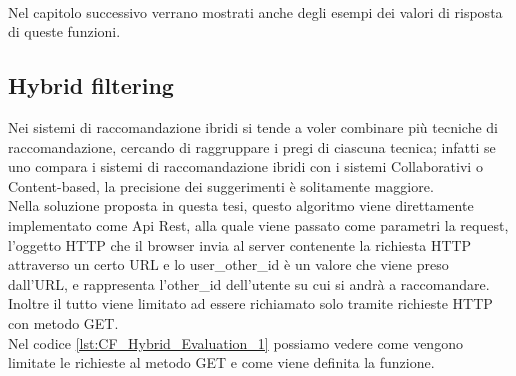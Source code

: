 \ \\
Nel capitolo successivo verrano mostrati anche degli esempi dei valori di risposta di queste funzioni.

\subsection{Hybrid filtering} 
Nei sistemi di raccomandazione ibridi si tende a voler combinare più tecniche di raccomandazione, cercando di raggruppare i 
pregi di ciascuna tecnica; infatti se uno compara i sistemi di raccomandazione ibridi con i sistemi Collaborativi o 
Content-based, la precisione dei suggerimenti è solitamente maggiore.\\
Nella soluzione proposta in questa tesi, questo algoritmo viene direttamente implementato come Api Rest, alla quale viene 
passato come parametri la request, l'oggetto HTTP che il browser invia al server contenente la richiesta HTTP attraverso
un certo URL e lo user\_other\_id è un valore che viene preso dall'URL, e rappresenta l'other\_id dell'utente su cui si andrà
a raccomandare. Inoltre il tutto viene limitato ad essere richiamato solo tramite richieste HTTP con metodo GET.\\ 
Nel codice \ref{lst:CF_Hybrid_Evaluation_1} possiamo vedere come vengono limitate le richieste al metodo GET e come 
viene definita la funzione.


